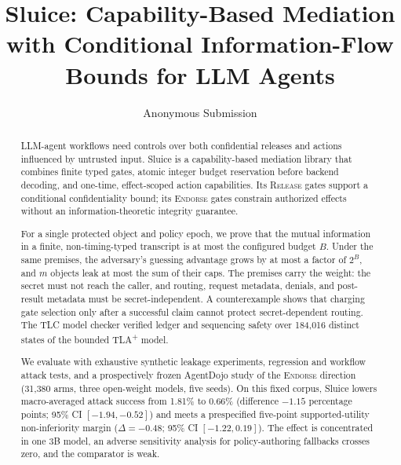 \documentclass[conference,compsoc]{IEEEtran}
\newcommand{\rev}[1]{#1} %
\newcommand{\sys}{Sluice}
\begin{document}
\title{Sluice: Capability-Based Mediation with Conditional Information-Flow Bounds for LLM Agents}


\author{Anonymous Submission}





\maketitle


\begin{abstract}
\rev{
LLM-agent workflows need controls over both confidential releases and actions influenced by untrusted input. \sys{} is a capability-based mediation library that combines finite typed gates, atomic integer budget reservation before backend decoding, and one-time, effect-scoped action capabilities. Its \textsc{Release} gates support a conditional confidentiality bound; its \textsc{Endorse} gates constrain authorized effects without an information-theoretic integrity guarantee.

For a single protected object and policy epoch, we prove that the mutual information in a finite, non-timing-typed transcript is at most the configured budget $B$. Under the same premises, the adversary's guessing advantage grows by at most a factor of $2^{B}$, and $m$ objects leak at most the sum of their caps. The premises carry the weight: the secret must not reach the caller, and routing, request metadata, denials, and post-result metadata must be secret-independent. A counterexample shows that charging gate selection only after a successful claim cannot protect secret-dependent routing. The TLC model checker verified ledger and sequencing safety over 184{,}016 distinct states of the bounded TLA\textsuperscript{+} model.

We evaluate with exhaustive synthetic leakage experiments, regression and workflow attack tests, and a prospectively frozen AgentDojo study of the \textsc{Endorse} direction (31{,}380 arms, three open-weight models, five seeds). On this fixed corpus, \sys{} lowers macro-averaged attack success from 1.81\% to 0.66\% (difference $-1.15$ percentage points; 95\% CI $[-1.94,-0.52]$) and meets a prespecified five-point supported-utility non-inferiority margin ($\Delta=-0.48$; 95\% CI $[-1.22,0.19]$). The effect is concentrated in one 3B model, an adverse sensitivity analysis for policy-authoring fallbacks crosses zero, and the comparator is weak.
}
\end{abstract}
\end{document}
